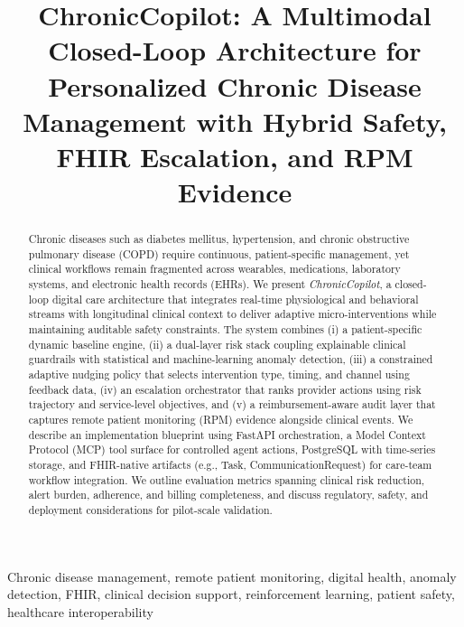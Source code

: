 \documentclass[conference]{IEEEtran}
\begin{document}
\title{ChronicCopilot: A Multimodal Closed-Loop Architecture for Personalized Chronic Disease Management with Hybrid Safety, FHIR Escalation, and RPM Evidence}

\author{
}

\maketitle

\begin{abstract}
Chronic diseases such as diabetes mellitus, hypertension, and chronic obstructive pulmonary disease (COPD) require continuous, patient-specific management, yet clinical workflows remain fragmented across wearables, medications, laboratory systems, and electronic health records (EHRs). We present \emph{ChronicCopilot}, a closed-loop digital care architecture that integrates real-time physiological and behavioral streams with longitudinal clinical context to deliver adaptive micro-interventions while maintaining auditable safety constraints. The system combines (i) a patient-specific dynamic baseline engine, (ii) a dual-layer risk stack coupling explainable clinical guardrails with statistical and machine-learning anomaly detection, (iii) a constrained adaptive nudging policy that selects intervention type, timing, and channel using feedback data, (iv) an escalation orchestrator that ranks provider actions using risk trajectory and service-level objectives, and (v) a reimbursement-aware audit layer that captures remote patient monitoring (RPM) evidence alongside clinical events. We describe an implementation blueprint using FastAPI orchestration, a Model Context Protocol (MCP) tool surface for controlled agent actions, PostgreSQL with time-series storage, and FHIR-native artifacts (e.g., Task, CommunicationRequest) for care-team workflow integration. We outline evaluation metrics spanning clinical risk reduction, alert burden, adherence, and billing completeness, and discuss regulatory, safety, and deployment considerations for pilot-scale validation.
\end{abstract}

\begin{IEEEkeywords}
Chronic disease management, remote patient monitoring, digital health, anomaly detection, FHIR, clinical decision support, reinforcement learning, patient safety, healthcare interoperability
\end{IEEEkeywords}
\end{document}
